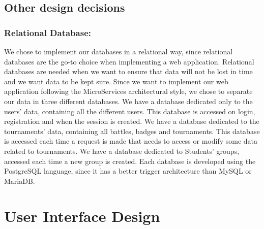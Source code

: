 \documentclass{article}
\begin{document}
{\subsection{Other design decisions}
    \subsubsection{Relational Database:} We chose to implement our databases in a relational way, since relational databases are the go-to choice when 
    implementing a web application. Relational databases are needed when we want to ensure that data will not be lost in time and we want data to be kept sure.
    Since we want to implement our web application following the MicroServices architectural style, we chose to separate our data in three different databases.
    We have a database dedicated only to the users' data, containing all the different users. This database is accessed on login, registration and when the 
    session is created.
    We have a database dedicated to the tournaments' data, containing all battles, badges and tournaments. This database is accessed each time a request 
    is made that needs to access or modify some data related to tournaments.
    We have a database dedicated to Students' groups, accessed each time a new group is created.
    Each database is developed using the PostgreSQL language, since it has a better trigger architecture than MySQL or MariaDB.

\newpage
\pagestyle{UserInterfaceStyle}
\section{User Interface Design}
\newpage
\pagestyle{RequirementsTraceabilityStyle}
}
\end{document}
